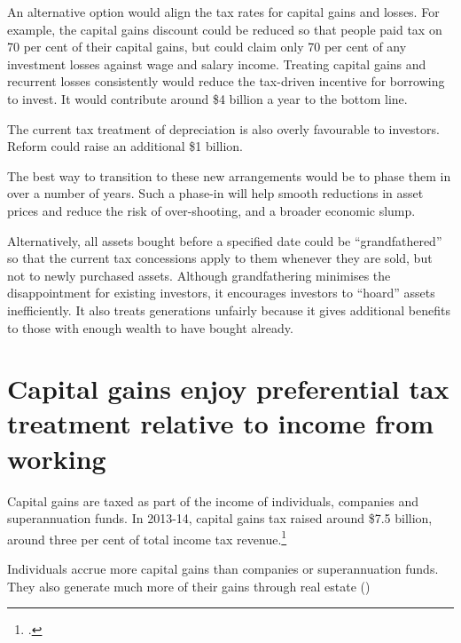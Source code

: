 \documentclass{grattan}\usepackage[]{graphicx}\usepackage[]{color}
\begin{document}
An alternative option would align the tax rates for capital gains and losses.  For example, the capital gains discount could be reduced so that people paid tax on 70 per cent of their capital gains, but could claim only 70 per cent of any investment losses against wage and salary income. Treating capital gains and recurrent losses consistently would reduce the tax-driven incentive for borrowing to invest. It would contribute around \$4 billion a year to the bottom line. 

The current tax treatment of depreciation is also overly favourable to investors. Reform could raise an additional \$1 billion. 

The best way to transition to these new arrangements would be to phase them in over a number of years. Such a phase-in will help smooth reductions in asset prices and reduce the risk of over-shooting, and a broader economic slump. 

Alternatively, all assets bought before a specified date could be ``grandfathered'' so that the current tax concessions apply to them whenever they are sold, but not to newly purchased assets. Although grandfathering minimises the disappointment for existing investors, it encourages investors to ``hoard'' assets inefficiently. It also treats generations unfairly because it gives additional benefits to those with enough wealth to have bought already.

\section{Capital gains enjoy preferential tax treatment relative to income from working}
Capital gains are taxed as part of the income of individuals, companies and superannuation funds. In 2013-14, capital gains tax raised around \$7.5 billion, around three per cent of total income tax revenue.\footcite{Treasury2014a} 

Individuals accrue more capital gains than companies or superannuation funds. They also generate much more of their gains through real estate ()
\end{document}
